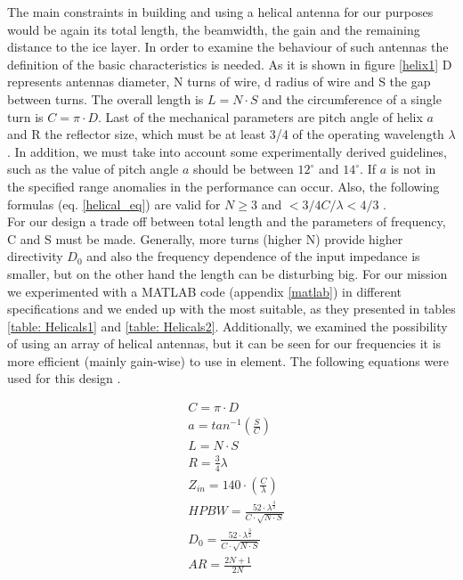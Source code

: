 \noindent
The main constraints in building and using a helical antenna for our purposes would be again its total length, the beamwidth, the gain and the remaining distance to the ice layer. In order to examine the behaviour of such antennas the definition of the basic characteristics is needed. As it is shown in figure \ref{helix1} D represents antennas diameter, N turns of wire, d radius of wire and S the gap between turns. The overall length is $L=N \cdot S$ and the circumference of a single turn is $C=\pi \cdot D$. Last of the mechanical parameters are pitch angle of helix $a$ and R the reflector size, which must be at least 3/4 of the operating wavelength $\lambda$. In addition, we must take into account some experimentally derived guidelines, such as the value of pitch angle $a$ should be between $12^\circ$ and $14^\circ$. If $a$ is not in the specified range anomalies in the performance can occur. Also, the following formulas (eq. \ref{helical_eq}) are valid for $N \geq 3$ and $<3/4C/\lambda<4/3$ \cite{balanis2}.\\

\noindent
For our design a trade off between total length and the parameters of frequency, C and S must be made. Generally, more turns (higher N) provide higher directivity $D_{0}$ and also the frequency dependence of the input impedance is smaller, but on the other hand the length can be disturbing big. For our mission we experimented with a MATLAB code (appendix \ref{matlab}) in different specifications and we ended up with the most suitable, as they presented in tables \ref{table: Helicals1} and \ref{table: Helicals2}. Additionally, we examined the possibility of using an array of helical antennas, but it can be seen for our frequencies it is more efficient (mainly gain-wise) to use in element. The following equations were used for this design \cite{balanis2}.

\begin{subequations}
\begin{align}
    &C=\pi \cdot D \\
    &a=tan^{-1}(\frac{S}{C}) \\
    &L=N \cdot S \\
    &R=\frac{3}{4} \lambda \\
    &Z_{in}=140 \cdot (\frac{C}{\lambda}) \\
    &HPBW=\frac{52 \cdot \lambda^{\frac{3}{2}}}{C \cdot \sqrt{N \cdot S}} \\
    &D_{0}=\frac{52 \cdot \lambda^{\frac{3}{2}}}{C \cdot \sqrt{N \cdot S}} \\
    &AR=\frac{2N+1}{2N} 
\end{align}
\label{helical_eq}
\end{subequations}

